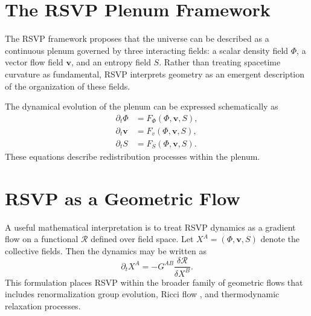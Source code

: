 \documentclass[12pt,a4paper]{article}
\theoremstyle{plain}
\theoremstyle{definition}
\theoremstyle{remark}
\begin{document}
\section{The RSVP Plenum Framework}

The RSVP framework proposes that the universe can be described as a
continuous plenum governed by three interacting fields: a scalar density
field $\Phi$, a vector flow field $\mathbf{v}$, and an entropy field
$S$. Rather than treating spacetime curvature as fundamental, RSVP
interprets geometry as an emergent description of the organization of
these fields.

The dynamical evolution of the plenum can be expressed schematically as
\begin{align}
\partial_t \Phi &= F_\Phi(\Phi,\mathbf{v},S), \\
\partial_t \mathbf{v} &= F_v(\Phi,\mathbf{v},S), \\
\partial_t S &= F_S(\Phi,\mathbf{v},S).
\end{align}
These equations describe redistribution processes within the plenum.

\section{RSVP as a Geometric Flow}

A useful mathematical interpretation is to treat RSVP dynamics as a
gradient flow on a functional $\mathcal{R}$ defined over field space.
Let $X^A = (\Phi, \mathbf{v}, S)$ denote the collective fields. Then
the dynamics may be written as
\begin{equation}
\partial_t X^A = -G^{AB}\frac{\delta \mathcal{R}}{\delta X^B}.
\end{equation}
This formulation places RSVP within the broader family of geometric
flows that includes renormalization group evolution, Ricci flow
\cite{Hamilton1982}, and thermodynamic relaxation processes.
\end{document}

